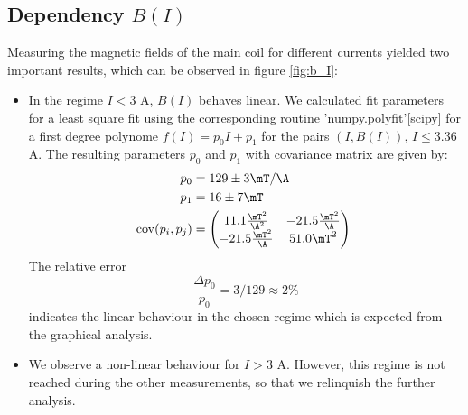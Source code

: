 \subsection{Dependency $B(I)$}
Measuring the magnetic fields of the main coil for different currents yielded two 
important results, which can be observed in figure \ref{fig:b_I}:
\begin{itemize}
\item
    In the regime $I < 3$ A, $B(I)$ behaves linear. We calculated fit parameters 
    for a least square fit using the corresponding routine 'numpy.polyfit'\ref{scipy} for 
    a first degree polynome $f(I) = p_0 I + p_1$ for the pairs $(I, B(I))$, $I \le 3.36$ A. 
    The resulting parameters $p_0$ and $p_1$ with covariance matrix are given by:
    \begin{align}
        p_0 &= 129 \pm 3 \mT / \A\\
        p_1 &= 16 \pm 7 \mT\\
        \mathrm{cov}(p_i, p_j) &= 
        \begin{pmatrix}
            11.1\frac{\mT^2}{\A^2} &-21.5\frac{\mT^2}{\A} \\
            -21.5\frac{\mT^2}{\A} &51.0\mT^2 \\
        \end{pmatrix} 
        \, \mathrm{}
    \end{align}
    The relative error 
    \begin{equation}
        \frac{\Delta p_0}{p_0} = 3 / 129 \approx 2\%
    \end{equation}
    indicates the linear behaviour in the chosen regime which is expected from the 
    graphical analysis. 
\item
    We observe a non-linear behaviour for $I > 3$ A. However, this regime is 
    not reached during the other measurements, so that we relinquish the further analysis. 
\end{itemize}
